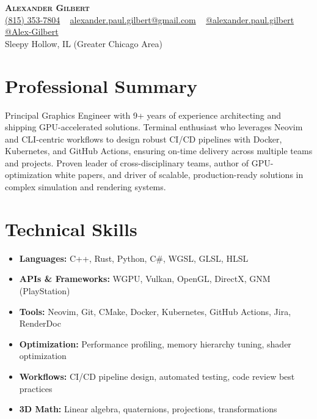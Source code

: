\documentclass[letterpaper,11pt]{article}
\begin{document}
\begin{center}
    \textbf{\Huge \scshape Alexander Gilbert} \\ \vspace{3pt}
    \small
    \faMobile* \hspace{.5pt} \href{tel:8153537804}{(815) 353-7804} ~
    \faAt \hspace{.5pt} \href{mailto:alexander.paul.gilbert@gmail.com}{alexander.paul.gilbert@gmail.com} ~
    \faMedium \hspace{.5pt} \href{https://medium.com/@alexander.paul.gilbert}{@alexander.paul.gilbert} \\
    \faGithub \hspace{.5pt} \href{https://github.com/Alex-Gilbert}{@Alex-Gilbert} \\
    \faMapMarker* \hspace{.5pt} Sleepy Hollow, IL (Greater Chicago Area)
\end{center}

\section{Professional Summary}
\small{
Principal Graphics Engineer with 9+ years of experience architecting and shipping GPU-accelerated solutions. Terminal enthusiast who leverages Neovim and CLI-centric workflows to design robust CI/CD pipelines with Docker, Kubernetes, and GitHub Actions, ensuring on-time delivery across multiple teams and projects. Proven leader of cross-disciplinary teams, author of GPU-optimization white papers, and driver of scalable, production-ready solutions in complex simulation and rendering systems.
}

\section{Technical Skills}
\begin{itemize}[leftmargin=0.15in]
  \item \textbf{Languages:} C++, Rust, Python, C\#, WGSL, GLSL, HLSL
  \item \textbf{APIs \& Frameworks:} WGPU, Vulkan, OpenGL, DirectX, GNM (PlayStation)
  \item \textbf{Tools:} Neovim, Git, CMake, Docker, Kubernetes, GitHub Actions, Jira, RenderDoc
  \item \textbf{Optimization:} Performance profiling, memory hierarchy tuning, shader optimization
  \item \textbf{Workflows:} CI/CD pipeline design, automated testing, code review best practices
  \item \textbf{3D Math:} Linear algebra, quaternions, projections, transformations
\end{itemize}
\end{document}
